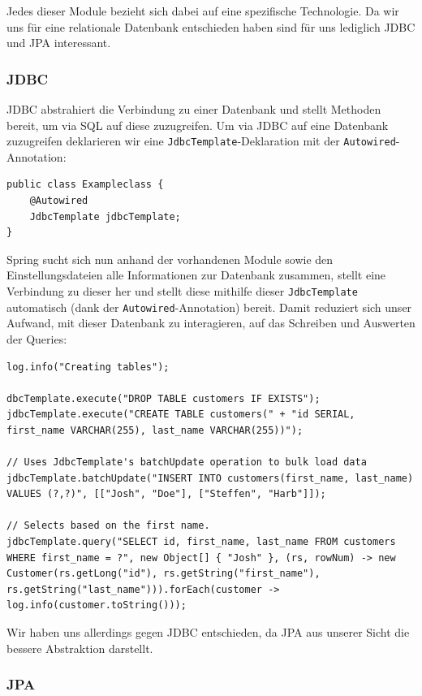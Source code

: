 \documentclass{article}
\begin{document}
Jedes dieser Module bezieht sich dabei auf eine spezifische Technologie.
Da wir uns für eine relationale Datenbank entschieden haben sind für uns lediglich JDBC und JPA interessant.

\subsubsection{JDBC}

JDBC abstrahiert die Verbindung zu einer Datenbank und stellt Methoden bereit, um via SQL auf diese zuzugreifen.
Um via JDBC auf eine Datenbank zuzugreifen deklarieren wir eine \texttt{JdbcTemplate}-Deklaration mit der \texttt{Autowired}-Annotation:

\begin{lstlisting}
public class Exampleclass {
    @Autowired
    JdbcTemplate jdbcTemplate;
}
\end{lstlisting}

Spring sucht sich nun anhand der vorhandenen Module sowie den Einstellungsdateien alle Informationen zur Datenbank zusammen, stellt eine Verbindung zu dieser her und stellt diese mithilfe dieser \texttt{JdbcTemplate} automatisch (dank der \texttt{Autowired}-Annotation) bereit.
Damit reduziert sich unser Aufwand, mit dieser Datenbank zu interagieren, auf das Schreiben und Auswerten der Queries:

\begin{lstlisting}
log.info("Creating tables");

dbcTemplate.execute("DROP TABLE customers IF EXISTS");
jdbcTemplate.execute("CREATE TABLE customers(" + "id SERIAL, first_name VARCHAR(255), last_name VARCHAR(255))");

// Uses JdbcTemplate's batchUpdate operation to bulk load data
jdbcTemplate.batchUpdate("INSERT INTO customers(first_name, last_name) VALUES (?,?)", [["Josh", "Doe"], ["Steffen", "Harb"]]);

// Selects based on the first name.
jdbcTemplate.query("SELECT id, first_name, last_name FROM customers WHERE first_name = ?", new Object[] { "Josh" }, (rs, rowNum) -> new Customer(rs.getLong("id"), rs.getString("first_name"), rs.getString("last_name"))).forEach(customer -> log.info(customer.toString()));
\end{lstlisting}

Wir haben uns allerdings gegen JDBC entschieden, da JPA aus unserer Sicht die bessere Abstraktion darstellt.

\subsubsection{JPA}
\end{document}
